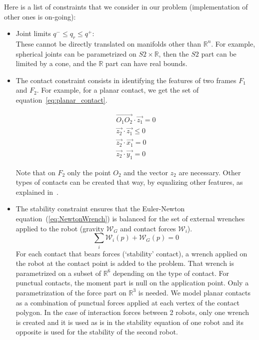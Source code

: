 Here is a list of constraints that we consider in our problem (implementation of other ones is on-going):
\begin{itemize}
\item Joint limits ${q^-} \leq q_r \leq {q^+}$:\\
These cannot be directly translated on manifolds other than $\mathbb{R}^n$.
For example, spherical joints can be parametrized on $S2 \times \mathbb{R}$, then the $S2$ part can be limited by a cone, and the $\mathbb{R}$ part can have real bounds.
\item The contact constraint consists in identifying the features of two frames $F_1$ and $F_2$.
For example, for a planar contact, we get the set of equation~\ref{eq:planar_contact}.

\begin{equation}
  \begin{split}
    \overrightarrow{O_1O_2}\cdot\vec{z_1} = 0\\
    \vec{z_2}\cdot\vec{z_1} \leq 0 \\
    \vec{z_2}\cdot\vec{x_1} = 0 \\
    \vec{z_2}\cdot\vec{y_1} = 0
  \end{split}
  \label{eq:planar_contact}
\end{equation}

Note that on $F_2$ only the point $O_2$ and the vector $z_2$ are necessary.
Other types of contacts can be created that way, by equalizing other features, as explained in~\cite{escande:ras:2013}.

\item The stability constraint ensures that the Euler-Newton equation~(\ref{eq:NewtonWrench}) is balanced for the set of external wrenches applied to the robot (gravity $\mathcal{W}_G$ and contact forces $\mathcal{W}_i$).
  \begin{equation}
    \sum_{i}{\mathcal{W}_i(p)} + {\mathcal{W}_G(p)} = 0
    \label{eq:NewtonWrench}
  \end{equation}
  For each contact that bears forces (`stability' contact), a wrench applied on the robot at the contact point is added to the problem.
  That wrench is parametrized on a subset of $\mathbb{R}^6$ depending on the type of contact.
  For punctual contacts, the moment part is null on the application point.
  Only a parametrization of the force part on $\mathbb{R}^3$ is needed.
  We model planar contacts as a combination of punctual forces applied at each vertex of the contact polygon.
  In the case of interaction forces between 2 robots, only one wrench is created and it is used as is in the stability equation of one robot and its opposite is used for the stability of the second robot.


\end{itemize}
